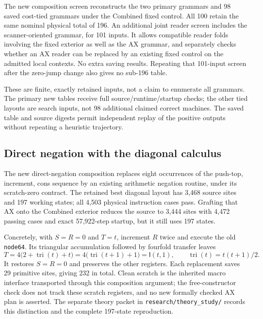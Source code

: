 \documentclass[11pt,letterpaper]{article}
\newcommand{\file}[1]{\texttt{\nolinkurl{#1}}}
\newcommand{\I}{\mathsf I}
\begin{document}
The new composition screen reconstructs the two primary grammars and
98 saved cost-tied grammars under the Combined fixed control. All 100
retain the same nominal physical total of 196. An additional joint
reader screen includes the scanner-oriented grammar, for 101 inputs.
It allows compatible reader folds involving the fixed exterior as well
as the AX grammar, and separately checks whether an AX reader can be
replaced by an existing fixed control on the admitted local contexts.
No extra saving results. Repeating that 101-input screen after the
zero-jump change also gives no sub-196 table.

These are finite, exactly retained inputs, not a claim to enumerate all
grammars. The primary new tables receive full source/runtime/startup
checks; the other tied layouts are search inputs, not 98 additional
claimed correct machines. The saved table and source digests permit
independent replay of the positive outputs without repeating a heuristic
trajectory.

\subsection{Direct negation with the diagonal calculus}

The new direct-negation composition replaces eight occurrences of the
push-top, increment, cons sequence by an existing arithmetic negation
routine, under its scratch-zero contract. The retained best diagonal
layout has 3,468 source sites and 197 working states; all 4,503 physical
instruction cases pass. Grafting that AX onto the Combined exterior
reduces the source to 3,444 sites with 4,472 passing cases and exact
57,922-step startup, but it still uses 197 states.

Concretely, with $S=R=0$ and $T=t$, increment $R$ twice and execute
the old \file{node64}. Its triangular accumulation followed by fourfold
transfer leaves
\[
 T=4\bigl(2+\operatorname{tri}(t)+t\bigr)
   =4\bigl(\operatorname{tri}(t+1)+1\bigr)=\I(t,1),
 \qquad \operatorname{tri}(t)=t(t+1)/2.
\]
It restores $S=R=0$ and preserves the other registers. Each replacement
saves 29 primitive sites, giving 232 in total. Clean scratch is the
inherited macro interface transported through this composition argument;
the free-constructor check does not track these scratch registers, and
no new formally checked AX plan is asserted. The separate theory packet
in \file{research/theory_study/} records this distinction and the complete
197-state reproduction.
\end{document}
